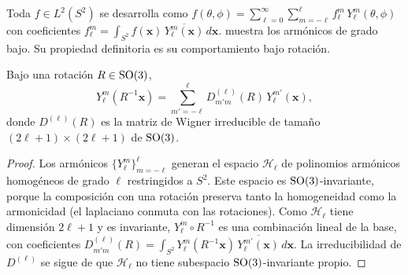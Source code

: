 Toda $f \in L^2(S^2)$ se desarrolla como $f(\theta, \phi) = \sum_{\ell=0}^{\infty}
\sum_{m=-\ell}^{\ell} f_\ell^m\, Y_\ell^m(\theta, \phi)$ con coeficientes
$f_\ell^m = \int_{S^2} f(\mathbf{x})\, \overline{Y_\ell^m(\mathbf{x})}\,
d\mathbf{x}$.  muestra los arm\'onicos de
grado bajo. Su propiedad definitoria es su comportamiento bajo rotaci\'on.

\begin{theorem}
\label{thm:groups:sh-transformation}
Bajo una rotaci\'on $R \in \operatorname{SO}(3)$,
\begin{equation}
  Y_\ell^m(R^{-1}\mathbf{x}) = \sum_{m'=-\ell}^{\ell} D^{(\ell)}_{m'm}(R)\,
    Y_\ell^{m'}(\mathbf{x}),
\end{equation}
donde $D^{(\ell)}(R)$ es la matriz de Wigner irreducible de tama\~no
$(2\ell+1)\times(2\ell+1)$ de $\operatorname{SO}(3)$.
\end{theorem}

\begin{proof}
Los arm\'onicos $\{Y_\ell^m\}_{m=-\ell}^{\ell}$ generan el espacio
$\mathcal{H}_\ell$ de polinomios arm\'onicos homog\'eneos de grado $\ell$
restringidos a $S^2$. Este espacio es $\operatorname{SO}(3)$-invariante, porque la composici\'on
con una rotaci\'on preserva tanto la homogeneidad como la armonicidad (el
laplaciano conmuta con las rotaciones). Como $\mathcal{H}_\ell$ tiene dimensi\'on
$2\ell+1$ y es invariante, $Y_\ell^m \circ R^{-1}$ es una combinaci\'on lineal de
la base, con coeficientes $D^{(\ell)}_{m'm}(R) = \int_{S^2} Y_\ell^m(R^{-1}
\mathbf{x})\, \overline{Y_\ell^{m'}(\mathbf{x})} \, d\mathbf{x}$. La
irreducibilidad de $D^{(\ell)}$ se sigue de que $\mathcal{H}_\ell$ no tiene
subespacio $\operatorname{SO}(3)$-invariante propio.
\end{proof}

